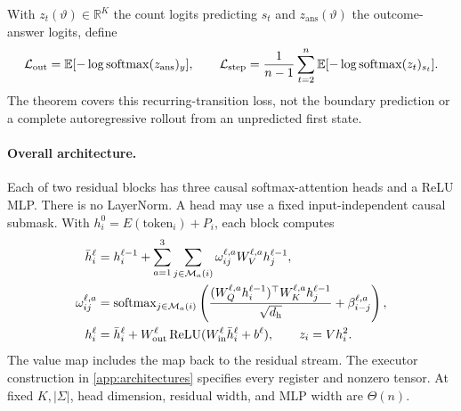 \begin{definition}\label{def:losses}
With $z_t(\vartheta)\in\mathbb R^K$ the count logits predicting $s_t$ and $z_{\mathrm{ans}}(\vartheta)$ the outcome-answer logits, define
\begin{equation}\label{eq:objectives}
\mathcal L_{\mathrm{out}}=\mathbb E[-\log\operatorname{softmax}(z_{\mathrm{ans}})_y],\qquad
\mathcal L_{\mathrm{step}}=\frac1{n-1}\sum_{t=2}^n\mathbb E[-\log\operatorname{softmax}(z_t)_{s_t}].
\end{equation}
The theorem covers this recurring-transition loss, not the boundary prediction or a complete autoregressive rollout from an unpredicted first state.
\end{definition}

\paragraph{Overall architecture.}\label{ass:arch}
Each of two residual blocks has three causal softmax-attention heads and a ReLU MLP. There is no LayerNorm. A head may use a fixed input-independent causal submask. With $h_i^0=E(\mathrm{token}_i)+P_i$, each block computes
\begin{align}
\bar h_i^\ell&=h_i^{\ell-1}+\sum_{a=1}^3\sum_{j\in\mathcal M_a(i)}\omega_{ij}^{\ell,a} W_V^{\ell,a}h_j^{\ell-1},\nonumber\\
\omega_{ij}^{\ell,a}&=\operatorname{softmax}_{j\in\mathcal M_a(i)}\left(\frac{(W_Q^{\ell,a}h_i^{\ell-1})^\top W_K^{\ell,a}h_j^{\ell-1}}{\sqrt{d_{\mathrm h}}}+\beta_{i-j}^{\ell,a}\right),\label{eq:block}\\
h_i^\ell&=\bar h_i^\ell+W_{\mathrm{out}}^\ell\operatorname{ReLU}(W_{\mathrm{in}}^\ell\bar h_i^\ell+b^\ell),\qquad z_i=Vh_i^2.\nonumber
\end{align}
The value map includes the map back to the residual stream. The executor construction in \cref{app:architectures} specifies every register and nonzero tensor. At fixed $K,|\Sigma|$, head dimension, residual width, and MLP width are $\Theta(n)$.

